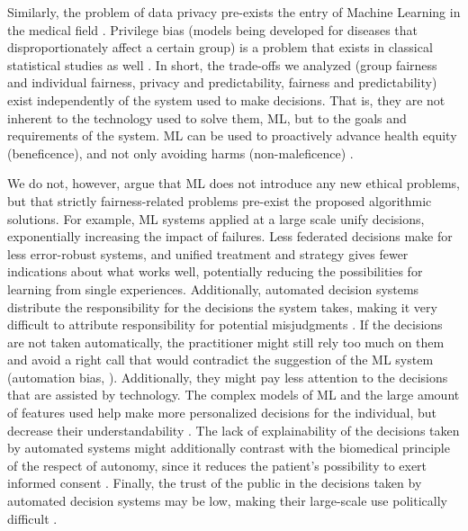 Similarly, the problem of data privacy pre-exists the entry of Machine Learning in the medical field \cite[p.~346]{Dijkstra2020}.
Privilege bias (models being developed for diseases that disproportionately affect a certain group) \cite[p.~5]{Rajkomar2018} is a problem that exists in classical statistical studies as well \cite{Jackson2019}.
In short, the trade-offs we analyzed (group fairness and individual fairness, privacy and predictability, fairness and predictability) exist independently of the system used to make decisions.
That is, they are not inherent to the technology used to solve them, ML, but to the goals and requirements of the system.
ML can be used to proactively advance health equity (beneficence), and not only avoiding harms (non-maleficence) \cite[p.~2]{Rajkomar2018}.

We do not, however, argue that ML does not introduce any new ethical problems, but that strictly fairness-related problems pre-exist the proposed algorithmic solutions.
For example, ML systems applied at a large scale unify decisions, exponentially increasing the impact of failures.
Less federated decisions make for less error-robust systems, and unified treatment and strategy gives fewer indications about what works well, potentially reducing the possibilities for learning from single experiences.
Additionally, automated decision systems distribute the responsibility for the decisions the system takes, making it very difficult to attribute responsibility for potential misjudgments \cite[p.~6]{Morley2020}.
If the decisions are not taken automatically, the practitioner might still rely too much on them and avoid a right call that would contradict the suggestion of the ML system \cite[p.~4]{Morley2020} (automation bias, \cite[p.~4]{Rajkomar2018}).
Additionally, they might pay less attention to the decisions that are assisted by technology.
The complex models of ML and the large amount of features used help make more personalized decisions for the individual, but decrease their understandability \cite[p.~4]{Rajkomar2018}.
The lack of explainability of the decisions taken by automated systems might additionally contrast with the biomedical principle of the respect of autonomy, since it reduces the patient's possibility to exert informed consent \cite[p.~346]{Dijkstra2020}.
Finally, the trust of the public in the decisions taken by automated decision systems may be low, making their large-scale use politically difficult \cite[p.~4]{Morley2020}.


